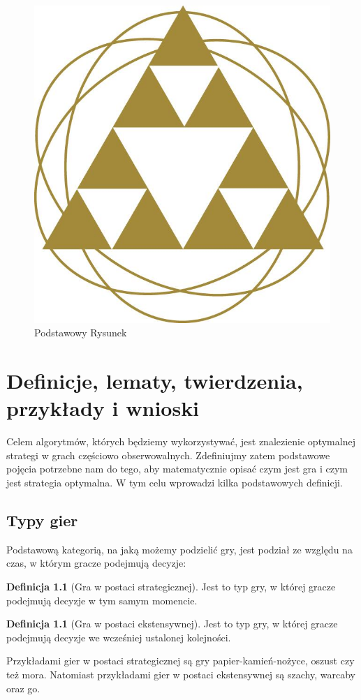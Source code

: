 \documentclass[inzynierska]{pwr_wmat_praca_dyplomowa}
\theoremstyle{plain}
\numberwithin{theorem}{chapter}
\theoremstyle{definition}
\numberwithin{theorem}{chapter}
\newtheorem{definition}[theorem]{Definicja}
\begin{document}
\begin{figure}[ht]

\centering
                     
\includegraphics[scale=0.27]{logo_w13.jpg}
\caption{Podstawowy Rysunek}\label{rys1}
\end{figure}
\label{rys:przykladowy} 


\chapter{Definicje, lematy, twierdzenia, przykłady i wnioski}
Celem algorytmów, których będziemy wykorzystywać, jest znalezienie optymalnej strategi w grach częściowo obserwowalnych. Zdefiniujmy zatem podstawowe pojęcia potrzebne nam do tego, aby matematycznie opisać czym jest gra i czym jest strategia optymalna.
W tym celu wprowadzi kilka podstawowych definicji.

\section{Typy gier }
Podstawową kategorią, na jaką możemy podzielić gry, jest podział ze względu na czas, w którym gracze podejmują decyzje:

\begin{definition}[Gra w postaci strategicznej]
Jest to typ gry, w której gracze podejmują decyzje w tym samym
momencie.
\end{definition}
\begin{definition}[Gra w postaci ekstensywnej]
	Jest to typ gry, w której gracze podejmują decyzje we wcześniej
	ustalonej kolejności.
\end{definition}
Przykładami gier w postaci strategicznej są gry papier-kamień-nożyce, oszust czy też mora. Natomiast przykładami gier w postaci ekstensywnej są szachy, warcaby oraz go.
\end{document}

